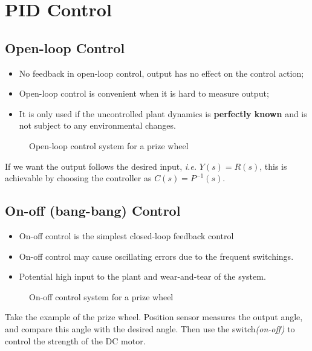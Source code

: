 \newpage
\section{PID Control}

\subsection{Open-loop Control} 
\begin{itemize}
    \item No feedback in open-loop control, output has no effect on the control action;
    
    \item Open-loop control is convenient when it is hard to measure output;
    
    \item It is only used if the uncontrolled plant dynamics is \textbf{perfectly known} and is not subject to any environmental changes.
\end{itemize}

\begin{figure}[H] 
    \centering 
    
    \caption{Open-loop control system for a prize wheel}
\end{figure}
If we want the output follows the desired input, \textit{i.e.} $Y(s)=R(s)$, this is achievable by choosing the controller as $C(s) = P^{-1}(s)$.

\subsection{On-off (bang-bang) Control}
\begin{itemize}
    \item On-off control is the simplest closed-loop feedback control
    \item On-off control may cause oscillating errors due to the frequent switchings.
    \item Potential high input to the plant and wear-and-tear of the system.
\end{itemize}

\begin{figure}[H] 
    \centering 
    
    \caption{On-off control system for a prize wheel}
\end{figure}
Take the example of the prize wheel. Position sensor measures the output angle, and compare this angle with the desired angle. Then use the switch\textit{(on-off)} to control the strength of the DC motor.

